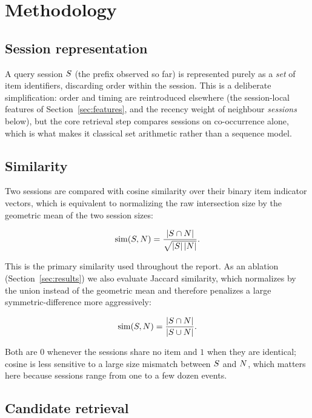 \section{Methodology}
\label{sec:methodology}

\subsection{Session representation}

A query session $S$ (the prefix observed so far) is represented purely as
a \emph{set} of item identifiers, discarding order within the session. This
is a deliberate simplification: order and timing are reintroduced elsewhere
(the session-local features of Section~\ref{sec:features}, and the recency
weight of neighbour \emph{sessions} below), but the core retrieval step
compares sessions on co-occurrence alone, which is what makes it classical
set arithmetic rather than a sequence model.

\subsection{Similarity}

Two sessions are compared with cosine similarity over their binary item
indicator vectors, which is equivalent to normalizing the raw intersection
size by the geometric mean of the two session sizes:

\begin{equation}
  \operatorname{sim}(S, N) = \frac{|S \cap N|}{\sqrt{|S|\,|N|}} .
  \label{eq:cosine}
\end{equation}

This is the primary similarity used throughout the report. As an ablation
(Section~\ref{sec:results}) we also evaluate Jaccard similarity, which
normalizes by the union instead of the geometric mean and therefore penalizes
a large symmetric-difference more aggressively:

\begin{equation}
  \operatorname{sim}(S, N) = \frac{|S \cap N|}{|S \cup N|} .
  \label{eq:jaccard}
\end{equation}

Both are $0$ whenever the sessions share no item and $1$ when they are
identical; cosine is less sensitive to a large size mismatch between $S$
and $N$, which matters here because sessions range from one to a few
dozen events.

\subsection{Candidate retrieval}

